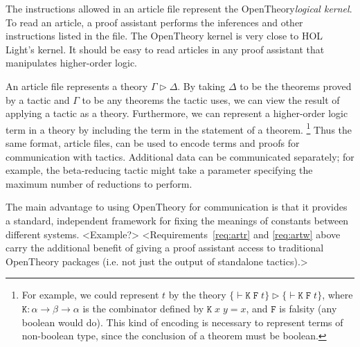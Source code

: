 \documentclass{llncs}
\newcommand{\OpenTheory}{OpenTheory\xspace}
\newcommand{\ie}{i.e.\xspace}
\begin{document}
The instructions allowed in an article file represent the \OpenTheory \emph{logical kernel}.
To read an article, a proof assistant performs the inferences and other instructions listed in the file.
The \OpenTheory kernel is very close to HOL Light's kernel.
It should be easy to read articles in any proof assistant that manipulates higher-order logic.

An article file represents a theory $\Gamma\rhd\Delta$.
By taking $\Delta$ to be the theorems proved by a tactic and $\Gamma$ to be any theorems the tactic uses, we can view the result of applying a tactic as a theory.
Furthermore, we can represent a higher-order logic term in a theory by including the term in the statement of a theorem. \footnote{For example, we could represent $t$ by the theory $\{\vdash\mathtt{K\;F\;}t\}\rhd\{\vdash\mathtt{K\;F\;}t\}$, where $\mathtt{K}:\alpha\to\beta\to\alpha$ is the combinator defined by $\mathtt{K}\;x\;y=x$, and $\mathtt{F}$ is falsity (any boolean would do).
This kind of encoding is necessary to represent terms of non-boolean type, since the conclusion of a theorem must be boolean.}
Thus the same format, article files, can be used to encode terms and proofs for communication with tactics.
Additional data can be communicated separately; for example, the beta-reducing tactic might take a parameter specifying the maximum number of reductions to perform.

The main advantage to using \OpenTheory for communication is that it provides a standard, independent framework for fixing the meanings of constants between different systems. <Example?>
<Requirements~\ref{req:artr} and \ref{req:artw} above carry the additional benefit of giving a proof assistant access to traditional \OpenTheory packages (\ie not just the output of standalone tactics).>
\end{document}
